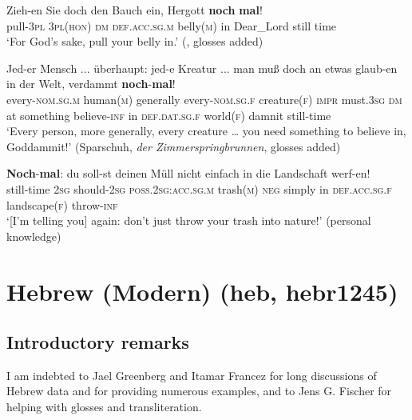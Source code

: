 \begin{exe}

	\ex \label{exAppendixGermanIterativeDirective1}
	\gll Zieh-en Sie doch den Bauch ein, Hergott \textbf{noch} \textbf{mal}!\\
	pull-3\textsc{pl} 3\textsc{pl}(\textsc{hon}) \textsc{dm} \textsc{def}.\textsc{acc}.\textsc{sg}.\textsc{m} belly(\textsc{m}) in Dear\_Lord still time\\
	\glt \lq For God's sake, pull your belly in.\rq{ }(\cite[627]{MetrichFaucher2009}, glosses added)
	
	\ex \label{exAppendixGermanIterativeDirective2}
	\gll Jed-er Mensch ... überhaupt: jed-e Kreatur ... man muß doch an etwas glaub-en in der Welt, verdammt \textbf{noch}-\textbf{mal}!\\
	every-\textsc{nom}.\textsc{sg}.\textsc{m} human(\textsc{m}) {} generally every-\textsc{nom}.\textsc{sg}.\textsc{f} creature(\textsc{f)} {} \textsc{impr} must.3\textsc{sg} \textsc{dm} at something believe-\textsc{inf} in \textsc{def}.\textsc{dat}.\textsc{sg}.\textsc{f} world(\textsc{f}) damnit still-time\\
	\glt \lq Every person, more generally, every creature … you need something to believe in, Goddammit!\rq{ }(Sparschuh, \textit{der Zimmerspringbrunnen}, glosses added)
	
	\ex \label{exAppendixGermanIterativeDirective3}
	\gll \textbf{Noch}-\textbf{mal}: du soll-st deinen Müll nicht einfach in die Landschaft werf-en!\\
	still-time 2\textsc{sg} should-2\textsc{sg} \textsc{poss}.2\textsc{sg}:\textsc{acc}.\textsc{sg}.\textsc{m} trash(\textsc{m}) \textsc{neg} simply in \textsc{def}.\textsc{acc}.\textsc{sg}.\textsc{f} landscape(\textsc{f}) throw-\textsc{inf}\\
	\glt \lq [I'm telling you] again: don't just throw your trash into nature!' (personal knowledge)
\end{exe}

\section{Hebrew (Modern) (heb, hebr1245)}
\label{appendixHebrew}

\subsection{Introductory remarks}
I am indebted to Jael Greenberg and Itamar Francez for long discussions of Hebrew data and for providing numerous examples, and to Jens G. Fischer for helping with glosses and transliteration.


